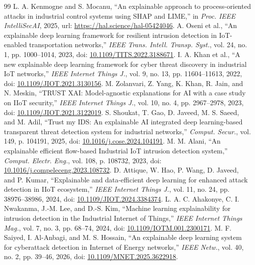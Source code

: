 \documentclass[10pt,a4paper]{article}
\begin{document}
\begin{thebibliography}{99}
 L. A. Kenmogne and S. Mocanu, ``An explainable approach to process-oriented attacks in industrial control systems using SHAP and LIME,'' in \emph{Proc. IEEE IntelliSecAI}, 2025, url: \url{https://hal.science/hal-05424046}.
 A. Oseni et al., ``An explainable deep learning framework for resilient intrusion detection in IoT-enabled transportation networks,'' \emph{IEEE Trans. Intell. Transp. Syst.}, vol. 24, no. 1, pp. 1000--1014, 2023, doi: \href{https://doi.org/10.1109/TITS.2022.3188671}{10.1109/TITS.2022.3188671}.
 I. A. Khan et al., ``A new explainable deep learning framework for cyber threat discovery in industrial IoT networks,'' \emph{IEEE Internet Things J.}, vol. 9, no. 13, pp. 11604--11613, 2022, doi: \href{https://doi.org/10.1109/JIOT.2021.3130156}{10.1109/JIOT.2021.3130156}.
 M. Zolanvari, Z. Yang, K. Khan, R. Jain, and N. Meskin, ``TRUST XAI: Model-agnostic explanations for AI with a case study on IIoT security,'' \emph{IEEE Internet Things J.}, vol. 10, no. 4, pp. 2967--2978, 2023, doi: \href{https://doi.org/10.1109/JIOT.2021.3122019}{10.1109/JIOT.2021.3122019}.
 S. Shoukat, T. Gao, D. Javeed, M. S. Saeed, and M. Adil, ``Trust my IDS: An explainable AI integrated deep learning-based transparent threat detection system for industrial networks,'' \emph{Comput. Secur.}, vol. 149, p. 104191, 2025, doi: \href{https://doi.org/10.1016/j.cose.2024.104191}{10.1016/j.cose.2024.104191}.
 M. M. Alani, ``An explainable efficient flow-based Industrial IoT intrusion detection system,'' \emph{Comput. Electr. Eng.}, vol. 108, p. 108732, 2023, doi: \href{https://doi.org/10.1016/j.compeleceng.2023.108732}{10.1016/j.compeleceng.2023.108732}.
 D. Attique, W. Hao, P. Wang, D. Javeed, and P. Kumar, ``Explainable and data-efficient deep learning for enhanced attack detection in IIoT ecosystem,'' \emph{IEEE Internet Things J.}, vol. 11, no. 24, pp. 38976--38986, 2024, doi: \href{https://doi.org/10.1109/JIOT.2024.3384374}{10.1109/JIOT.2024.3384374}.
 L. A. C. Ahakonye, C. I. Nwakanma, J.-M. Lee, and D.-S. Kim, ``Machine learning explainability for intrusion detection in the Industrial Internet of Things,'' \emph{IEEE Internet Things Mag.}, vol. 7, no. 3, pp. 68--74, 2024, doi: \href{https://doi.org/10.1109/IOTM.001.2300171}{10.1109/IOTM.001.2300171}.
 M. F. Saiyed, I. Al-Anbagi, and M. S. Hossain, ``An explainable deep learning system for cyberattack detection in Internet of Energy networks,'' \emph{IEEE Netw.}, vol. 40, no. 2, pp. 39--46, 2026, doi: \href{https://doi.org/10.1109/MNET.2025.3622918}{10.1109/MNET.2025.3622918}.

\end{thebibliography}
\end{document}
